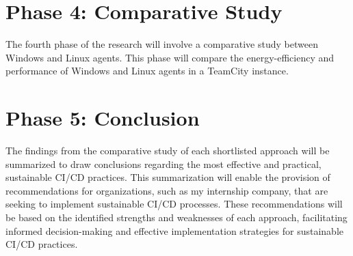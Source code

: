 \section{Phase 4: Comparative Study}
The fourth phase of the research will involve a comparative study between Windows and Linux agents. This phase will compare the energy-efficiency and performance of Windows and Linux agents in a TeamCity instance. 

\section{Phase 5: Conclusion}
The findings from the comparative study of each shortlisted approach will be summarized to draw conclusions regarding the most effective and practical, sustainable CI/CD practices. This summarization will enable the provision of recommendations for organizations, such as my internship company, that are seeking to implement sustainable CI/CD processes. These recommendations will be based on the identified strengths and weaknesses of each approach, facilitating informed decision-making and effective implementation strategies for sustainable CI/CD practices.

